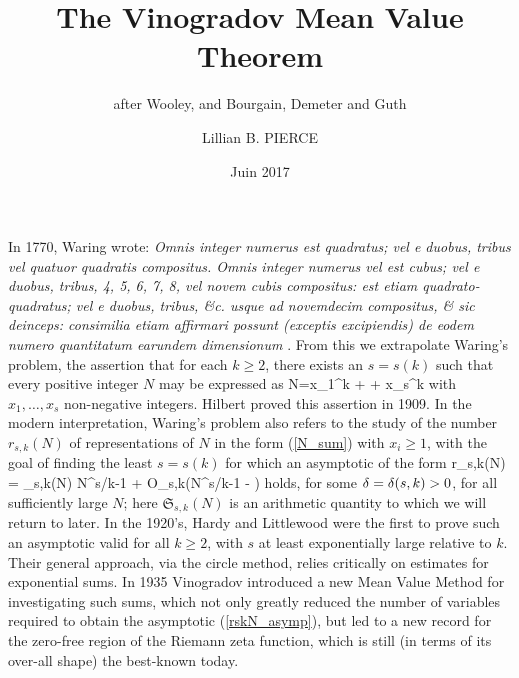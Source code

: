 \documentclass[brochure,english,12pt]{bourbaki}%
\date{Juin 2017}
\title{The Vinogradov Mean Value Theorem}
\subtitle{after Wooley, and Bourgain, Demeter and Guth}
\author{Lillian B. PIERCE}
\begin{document}
\maketitle


\bigskip

In 1770, Waring wrote: \emph{Omnis integer numerus est quadratus; vel e duobus, tribus vel quatuor quadratis compositus.
Omnis integer numerus vel est cubus; vel e duobus, tribus, 4, 5, 6, 7, 8, vel novem cubis compositus: est etiam quadrato-quadratus; vel e duobus, tribus, \&c. usque ad novemdecim compositus, \& sic deinceps: consimilia etiam affirmari possunt (exceptis excipiendis) de eodem numero quantitatum earundem dimensionum} \cite[Thm. XLVII p. 349]{War70}. From this we extrapolate Waring's problem, the assertion that for each $k \geq 2$, there exists an $s=s(k)$ such that every positive integer $N$ may be expressed as 
\beq\label{N_sum}
 N=x_1^k + \cdots + x_s^k 
\eeq
with $x_1,\ldots, x_s$ non-negative integers.
Hilbert proved this assertion in 1909. In the modern interpretation, Waring's problem also refers to the study of the number $r_{s,k}(N)$ of representations of $N$ in the form (\ref{N_sum}) with $x_i \geq 1$, with the goal of finding 
the least $s=s(k)$ for which an asymptotic  of the form
\beq\label{rskN_asymp}
r_{s,k}(N) =  _{s,k}(N) N^{s/k-1}  + O_{s,k}(N^{s/k-1 - \del})
\eeq
holds, for some $\delta=\delta(s,k)>0$, for all sufficiently large $N$; here $\mathfrak{S}_{s,k}(N)$ is an arithmetic quantity to which we will return to later. In the 1920's, Hardy and Littlewood were the first to prove such an asymptotic valid  for all $k \geq 2$, with $s$ at least exponentially large relative to $k$. Their general approach, via the circle method, relies critically on estimates for exponential sums. In 1935 Vinogradov introduced a new Mean Value Method for investigating such sums, which not only greatly reduced the number of variables required to obtain the asymptotic (\ref{rskN_asymp}), but led to a new record for the zero-free region of the Riemann zeta function, which is still (in terms of its over-all shape) the best-known today.
\end{document}
